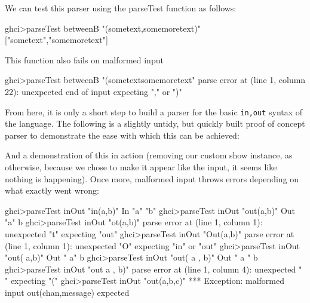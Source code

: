 We can test this parser using the parseTest function as follows:

\begin{code}
    ghci>parseTest betweenB "(sometext,somemoretext)"
    ["sometext","somemoretext"]
\end{code}

This function also fails on malformed input

\begin{code}
    ghci>parseTest betweenB "(sometextsomemoretext"
    parse error at (line 1, column 22):
    unexpected end of input
    expecting "," or ")"
\end{code}

From here, it is only a short step to build a parser for the basic \verb!in,out! syntax of the language. The following is a slightly untidy, but quickly built proof of concept parser to demonstrate the ease with which this can be achieved:


And a demonstration of this in action (removing our custom show instance, as otherwise, because we chose to make it appear like the input, it seems like nothing is happening). Once more, malformed input throws errors depending on what exactly went wrong: 

\begin{code}
    ghci>parseTest inOut "in(a,b)"
    In "a" "b"
    ghci>parseTest inOut "out(a,b)"
    Out "a" b
    ghci>parseTest inOut "ot(a,b)"
    parse error at (line 1, column 1):
    unexpected "t"
    expecting "out"
    ghci>parseTest inOut "Out(a,b)"
    parse error at (line 1, column 1):
    unexpected "O"
    expecting "in" or "out"
    ghci>parseTest inOut "out( a,b)"
    Out " a" b
    ghci>parseTest inOut "out( a ,      b)"
    Out " a "       b
    ghci>parseTest inOut "out  a ,      b)"
    parse error at (line 1, column 4):
    unexpected " "
    expecting "("
    ghci>parseTest inOut "out(a,b,c)"
    *** Exception: malformed input out(chan,message) expected
\end{code}

